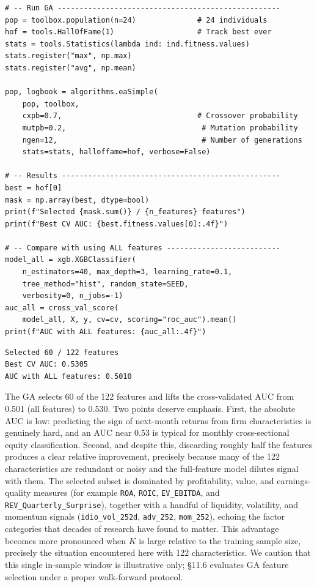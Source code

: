 \begin{verbatim}
# -- Run GA ---------------------------------------------------
pop = toolbox.population(n=24)              # 24 individuals
hof = tools.HallOfFame(1)                   # Track best ever
stats = tools.Statistics(lambda ind: ind.fitness.values)
stats.register("max", np.max)
stats.register("avg", np.mean)

pop, logbook = algorithms.eaSimple(
    pop, toolbox,
    cxpb=0.7,                               # Crossover probability
    mutpb=0.2,                               # Mutation probability
    ngen=12,                                 # Number of generations
    stats=stats, halloffame=hof, verbose=False)

# -- Results --------------------------------------------------
best = hof[0]
mask = np.array(best, dtype=bool)
print(f"Selected {mask.sum()} / {n_features} features")
print(f"Best CV AUC: {best.fitness.values[0]:.4f}")

# -- Compare with using ALL features --------------------------
model_all = xgb.XGBClassifier(
    n_estimators=40, max_depth=3, learning_rate=0.1,
    tree_method="hist", random_state=SEED,
    verbosity=0, n_jobs=-1)
auc_all = cross_val_score(
    model_all, X, y, cv=cv, scoring="roc_auc").mean()
print(f"AUC with ALL features: {auc_all:.4f}")
\end{verbatim}

\begin{verbatim}
Selected 60 / 122 features
Best CV AUC: 0.5305
AUC with ALL features: 0.5010
\end{verbatim}

The GA selects 60 of the 122 features and lifts the cross-validated AUC from 0.501 (all features) to 0.530. Two points deserve emphasis. First, the absolute AUC is low: predicting the sign of next-month returns from firm characteristics is genuinely hard, and an AUC near 0.53 is typical for monthly cross-sectional equity classification. Second, and despite this, discarding roughly half the features produces a clear relative improvement, precisely because many of the 122 characteristics are redundant or noisy and the full-feature model dilutes signal with them. The selected subset is dominated by profitability, value, and earnings-quality measures (for example \texttt{ROA}, \texttt{ROIC}, \texttt{EV\_EBITDA}, and \texttt{REV\_Quarterly\_Surprise}), together with a handful of liquidity, volatility, and momentum signals (\texttt{idio\_vol\_252d}, \texttt{adv\_252}, \texttt{mom\_252}), echoing the factor categories that decades of research have found to matter. This advantage becomes more pronounced when $K$ is large relative to the training sample size, precisely the situation encountered here with 122 characteristics. We caution that this single in-sample window is illustrative only; §11.6 evaluates GA feature selection under a proper walk-forward protocol.

